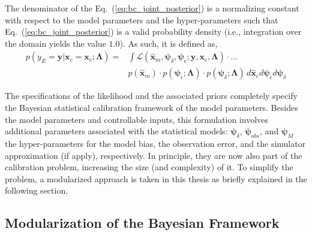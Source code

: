 The denominator of the Eq.~(\ref{eq:bc_joint_posterior}) is a normalizing constant with respect to the model parameters and the hyper-parameters such that Eq.~(\ref{eq:bc_joint_posterior}) is a valid probability density (i.e., integration over the domain yields the value $1.0$).
As such, it is defined as,
\begin{equation}
	\begin{split}
	p(y_E = \mathbf{y} | \bm{x}_c = \mathbf{x}_c ; \bm{\Lambda}) = & \int \mathcal{L}(\hat{\bm{x}}_m,\bm{\psi}_\delta, \bm{\psi}_\epsilon ;  \mathbf{y}, \mathbf{x}_c, \bm{\Lambda}) \cdot \ldots \\
	& p(\hat{\bm{x}}_m) \cdot p(\bm{\psi}_\epsilon; \bm{\Lambda}) \cdot p(\bm{\psi}_\delta; \bm{\Lambda}) \, d\hat{\bm{x}}_{c} d\bm{\psi}_\epsilon d\bm{\psi}_\delta
	\end{split}
\label{eq:bc_normalizing_constant}
\end{equation}

The specifications of the likelihood and the associated priors completely specify the Bayesian statistical calibration framework of the model parameters.
Besides the model parameters and controllable inputs, this formulation involves additional parameters associated with the statistical models: $\bm{\psi}_\delta$, $\bm{\psi}_{obs}$, and $\bm{\psi}_M$ the hyper-parameters for the model bias, the observation error, and the simulator approximation (if apply), respectively.
In principle, they are now also part of the calibration problem, increasing the size (and complexity) of it.
To simplify the problem, a modularized approach is taken in this thesis as briefly explained in the following section.

\subsection{Modularization of the Bayesian Framework}\label{sub:bc_modularization}

